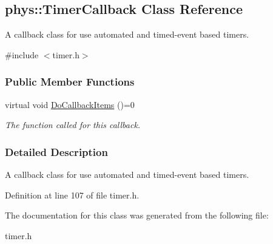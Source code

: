 \hypertarget{classphys_1_1TimerCallback}{
\subsection{phys::TimerCallback Class Reference}
\label{d1/d18/classphys_1_1TimerCallback}
}


A callback class for use automated and timed-\/event based timers.  




{\ttfamily \#include $<$timer.h$>$}

\subsubsection*{Public Member Functions}
\begin{DoxyCompactItemize}
\item 
\hypertarget{classphys_1_1TimerCallback_a8ceb51cd1b902e243e35cff61f4ae9d9}{
virtual void \hyperlink{classphys_1_1TimerCallback_a8ceb51cd1b902e243e35cff61f4ae9d9}{DoCallbackItems} ()=0}
\label{d1/d18/classphys_1_1TimerCallback_a8ceb51cd1b902e243e35cff61f4ae9d9}

\begin{DoxyCompactList}\small\item\em The function called for this callback. \item\end{DoxyCompactList}\end{DoxyCompactItemize}


\subsubsection{Detailed Description}
A callback class for use automated and timed-\/event based timers. 

Definition at line 107 of file timer.h.



The documentation for this class was generated from the following file:\begin{DoxyCompactItemize}
\item 
timer.h\end{DoxyCompactItemize}
